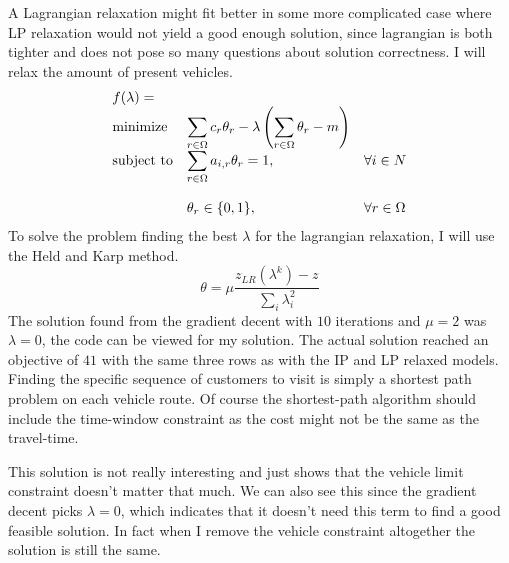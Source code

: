 \documentclass{article}
\begin{document}
    A Lagrangian relaxation might fit better in some more complicated case where LP relaxation would not yield a good enough solution, since lagrangian is both tighter and does not pose so many questions about solution correctness.
    I will relax the amount of present vehicles.
    \begin{equation*}
        \begin{array}{ll@{}ll}
            f(\lambda) =& \\
            \text{minimize}  & \displaystyle\sum_{r \in \Omega} c_r \theta_r - \lambda \left( \sum_{r \in \Omega} \theta_r - m \right)& &\\
            \text{subject to}& \displaystyle\sum_{r \in \Omega} a_{i, r} \theta_r = 1 ,&   &\forall i \in N\\\\
            & \displaystyle \theta_r  \in \{0,1\},  && \forall r \in \Omega
        \end{array}
    \end{equation*}
    To solve the problem finding the best $\lambda$ for the lagrangian relaxation, I will use the Held and Karp method.
    \[
        \theta = \mu \frac{z_{LR}(\lambda^k) - z}{\sum_i \lambda^2_i}
    \]
    The solution found from the gradient decent with $10$ iterations and $\mu=2$ was $\lambda = 0$, the code can be viewed for my solution.
    The actual solution reached an objective of $41$ with the same three rows as with the IP and LP relaxed models.
    Finding the specific sequence of customers to visit is simply a shortest path problem on each vehicle route.
    Of course the shortest-path algorithm should include the time-window constraint as the cost might not be the same as the travel-time.

    This solution is not really interesting and just shows that the vehicle limit constraint doesn't matter that much.
    We can also see this since the gradient decent picks $\lambda = 0$, which indicates that it doesn't need this term to find a good feasible solution.
    In fact when I remove the vehicle constraint altogether the solution is still the same.
\end{document}
